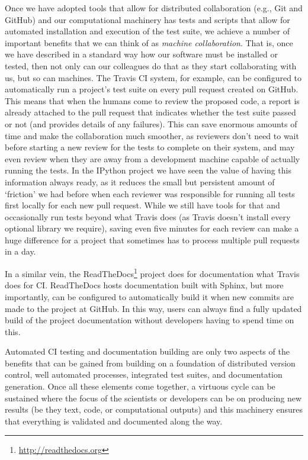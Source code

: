 \documentclass[ChapterTOCs,krantz2]{krantz} %
\begin{document}
Once we have adopted tools that allow for distributed collaboration (e.g., Git
and GitHub) and our computational machinery has tests and scripts that allow
for automated installation and execution of the test suite, we achieve a number
of important benefits that we can think of as \emph{machine collaboration}.
That is, once we have described in a standard way how our software must be
installed or tested, then not only can our colleagues do that as they start
collaborating with us, but so can machines.  The Travis CI system, for example,
can be configured to automatically run a project's test suite on every pull
request created on GitHub.  This means that when the humans come to review the
proposed code, a report is already attached to the pull request that indicates
whether the test suite passed or not (and provides details of any failures).
This can save enormous amounts of time and make the collaboration much
smoother, as reviewers don't need to wait before starting a new review for the
tests to complete on their system, and may even review when they are away from
a development machine capable of actually running the tests.  In the IPython
project we have seen the value of having this information always ready, as it
reduces the small but persistent amount of `friction' we had before when each
reviewer was responsible for running all tests first locally for each new pull
request.  While we still have tools for that and occasionally run tests beyond
what Travis does (as Travis doesn't install every optional library we require),
saving even five minutes for each review can make a huge difference for a
project that sometimes has to process multiple pull requests in a day.

In a similar vein, the ReadTheDocs\footnote{\url{http://readthedocs.org}}
project does for documentation what Travis does for CI.  ReadTheDocs hosts
documentation built with Sphinx, but more importantly, can be configured to
automatically build it when new commits are made to the project at GitHub.  In
this way, users can always find a fully updated build of the project
documentation without developers having to spend time on this.

Automated CI testing and documentation building are only two aspects of the
benefits that can be gained from building on a foundation of distributed
version control, well automated processes, integrated test suites, and
documentation generation.  Once all these elements come together, a virtuous
cycle can be sustained where the focus of the scientists or developers can be
on producing new results (be they text, code, or computational outputs) and this
machinery ensures that everything is validated and documented along the way.
\end{document}
